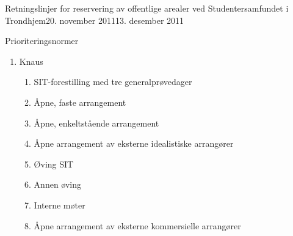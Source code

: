 \documentclass[fsbok.tex]{subfiles}
\begin{document}
\begin{instruks}{Retningslinjer for reservering av offentlige arealer
    ved Studentersamfundet i Trondhjem}{20. november 2011}{13. desember 2011}
\begin{instruksledd}{Prioriteringsnormer}
\begin{enumerate}
\begin{enumerate}
\begin{enumerate}
                            \item Åpne, faste arrangement\footnote{Med ``åpne, faste
                                arrangement'' menes regelmessige arrangementer/konsepter som er åpne for alle og som
                                arrangeres av en av Samfundets gjenger.}
                            \item Fotball
                            \item Åpne, enkeltstående arrangement \footnote{Med ``åpne,
                                enkeltstående arrangement'' menes arrangementer som er åpne for alle og som arrangeres av en
                        av Samfundets gjenger, men som ikke faller inn under noe fast,
                        jevnlig konsept.}
                            \item Åpne arrangement av eksterne idealistiske arrangører (utlån)
                            \item Øvinger
                            \item Faste interne arrangement\footnote{For eksempel Mingle
                                Vingle}
                            \item Åpne arrangement av eksterne kommersielle arrangører (utleie)
                            \item Lukkete arrangement av eksterne arrangører (utleie)
                            \item  Interne møter
                            \item Interne fester
                        \end{enumerate}
                   \item Knaus
                        \begin{enumerate}
                            \item  SIT-forestilling med tre generalprøvedager
                            \item  Åpne, faste arrangement
                            \item  Åpne, enkeltstående arrangement
                            \item  Åpne arrangement av eksterne idealistiske arrangører
                            \item  Øving SIT
                            \item Annen øving
                            \item Interne møter
                            \item Åpne arrangement av eksterne kommersielle arrangører

\end{enumerate}
\end{enumerate}
\end{enumerate}
\end{instruksledd}
\end{instruks}
\end{document}
